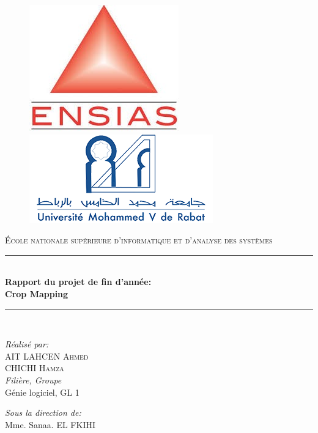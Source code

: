 \documentclass[12pt, openany]{report}
\newcommand{\HRule}{\rule{\linewidth}{0.5mm}}
\begin{document}
\begin{titlepage}
  \begin{sffamily}
  \begin{center}

	\begin{figure}[t]
	   \begin{minipage}{0.48\textwidth } 
	     \includegraphics[width=.3\linewidth , left]{ensias.JPG}
	   \end{minipage}\hfill
	   \begin{minipage}{0.48\textwidth }
	     \includegraphics[width=.4\linewidth , right]{univesite.JPG}
	   \end{minipage}
	\end{figure}
     
    \textsc{\LARGE École nationale supérieure d'informatique et d'analyse des systèmes}\\[4cm]


    \HRule \\[0.5cm]
    { \huge \bfseries Rapport du projet de fin d'année: \\Crop Mapping\\[0.4cm] }
	\HRule\\[4cm]

    \begin{minipage}{0.4\textwidth}
      \begin{flushleft} \large
        \emph{Réalisé par:}\\
            AIT LAHCEN \textsc{Ahmed}\\
	        CHICHI \textsc{Hamza}\\
       \emph{Filière, Groupe}\\
	        Génie logiciel, GL 1\\
      \end{flushleft}
    \end{minipage}
    \begin{minipage}{0.4\textwidth}
      \begin{flushright} \large
       \emph{Sous la direction de:}\\
	Mme. Sanaa. \textsc{EL FKIHI}\\
	\end{flushright}
    \end{minipage}


\end{center}
\end{sffamily}
\end{titlepage}
\end{document}

